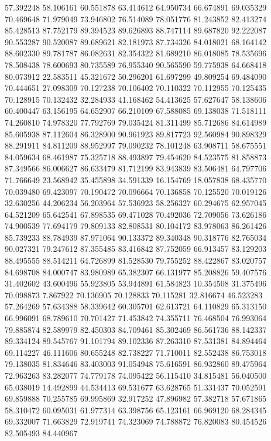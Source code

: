 57.392248
58.106161
60.551878
63.414612
64.950734
66.674891
69.035329
70.469648
71.979049
73.946802
76.514089
78.051776
81.243852
82.413274
85.428513
87.752179
89.394523
89.626893
88.747114
89.687820
92.222087
90.553287
90.520087
89.689621
82.181973
87.734326
84.018021
68.164142
88.602330
89.781787
86.082631
82.354322
81.689210
86.018085
78.535696
78.508438
78.600693
80.735589
76.955340
90.565590
59.775938
64.668418
80.073912
22.583511
45.321672
50.296201
61.697299
49.809254
69.484090
70.444651
27.098309
70.127238
70.106402
70.110322
70.112955
70.125435
70.128915
70.132432
32.284933
41.168462
54.413625
57.627647
58.138606
60.400447
63.156195
64.652907
66.210109
67.588085
69.138038
71.518111
74.260810
74.978320
77.792769
79.035424
81.311499
85.712686
84.614989
85.605938
87.112604
86.328900
90.961923
89.817723
92.560984
90.898329
88.291911
84.811209
88.952997
79.090232
78.101248
63.908711
58.675551
84.059634
68.461987
75.325718
88.493897
79.454620
84.523575
81.858873
87.349566
86.006627
86.633479
81.712199
83.943839
83.506481
64.797706
71.766649
23.568942
35.455898
34.591339
16.154769
18.057838
68.435770
70.039480
69.423097
70.190472
70.096664
70.136858
70.125520
70.019126
32.630256
44.206234
56.203964
57.536923
58.256327
60.294675
62.957045
64.521209
65.642541
67.898535
69.471028
70.492036
72.709056
73.626186
74.900539
77.694179
79.809133
82.808531
80.104172
83.978063
86.261426
85.739233
88.784939
87.971064
90.133372
89.340348
90.318776
82.765034
90.027321
79.247612
87.355485
83.416842
87.752059
66.913457
83.129203
88.495555
88.514211
64.726899
81.528530
79.755252
88.422867
83.020757
84.698708
84.000747
83.980989
65.382307
66.131977
85.208826
59.407576
31.402602
43.600496
55.923805
53.944891
61.584823
10.354508
31.375496
70.098873
7.867922
70.136905
70.128833
70.115281
32.816674
46.523283
57.264269
57.634388
58.339642
60.305701
62.613721
64.110829
65.313150
66.996091
68.789610
70.701427
71.453842
74.355711
76.468504
76.993064
79.885874
82.589979
82.450303
84.709461
85.302469
86.561736
88.142337
89.334124
89.545767
91.101794
89.102336
87.263310
87.531381
84.894464
69.114227
46.111606
80.655248
82.738227
71.710011
82.552438
86.753018
79.138035
81.834646
83.403003
91.054948
75.616591
86.932860
89.475964
72.963263
83.282077
74.779178
74.095422
56.115410
34.815481
56.040500
65.038019
14.492899
44.534413
69.531677
63.628765
51.331437
70.052591
69.859888
70.255785
69.995869
32.917252
47.896982
57.382718
57.671865
58.310472
60.095031
61.977314
63.398756
65.123161
66.969120
68.284345
69.332007
71.663829
72.919741
74.323069
74.788872
76.820083
80.454526
82.505493
84.440967
